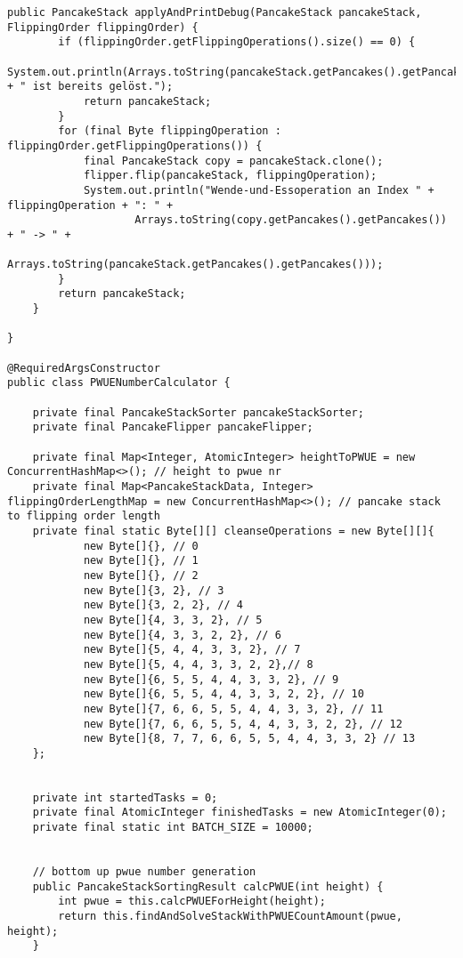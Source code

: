 \begin{lstlisting}[label={lst:source}]
    public PancakeStack applyAndPrintDebug(PancakeStack pancakeStack, FlippingOrder flippingOrder) {
        if (flippingOrder.getFlippingOperations().size() == 0) {
            System.out.println(Arrays.toString(pancakeStack.getPancakes().getPancakes()) + " ist bereits gelöst.");
            return pancakeStack;
        }
        for (final Byte flippingOperation : flippingOrder.getFlippingOperations()) {
            final PancakeStack copy = pancakeStack.clone();
            flipper.flip(pancakeStack, flippingOperation);
            System.out.println("Wende-und-Essoperation an Index " + flippingOperation + ": " +
                    Arrays.toString(copy.getPancakes().getPancakes()) + " -> " +
                    Arrays.toString(pancakeStack.getPancakes().getPancakes()));
        }
        return pancakeStack;
    }

}

@RequiredArgsConstructor
public class PWUENumberCalculator {

    private final PancakeStackSorter pancakeStackSorter;
    private final PancakeFlipper pancakeFlipper;

    private final Map<Integer, AtomicInteger> heightToPWUE = new ConcurrentHashMap<>(); // height to pwue nr
    private final Map<PancakeStackData, Integer> flippingOrderLengthMap = new ConcurrentHashMap<>(); // pancake stack to flipping order length
    private final static Byte[][] cleanseOperations = new Byte[][]{
            new Byte[]{}, // 0
            new Byte[]{}, // 1
            new Byte[]{}, // 2
            new Byte[]{3, 2}, // 3
            new Byte[]{3, 2, 2}, // 4
            new Byte[]{4, 3, 3, 2}, // 5
            new Byte[]{4, 3, 3, 2, 2}, // 6
            new Byte[]{5, 4, 4, 3, 3, 2}, // 7
            new Byte[]{5, 4, 4, 3, 3, 2, 2},// 8
            new Byte[]{6, 5, 5, 4, 4, 3, 3, 2}, // 9
            new Byte[]{6, 5, 5, 4, 4, 3, 3, 2, 2}, // 10
            new Byte[]{7, 6, 6, 5, 5, 4, 4, 3, 3, 2}, // 11
            new Byte[]{7, 6, 6, 5, 5, 4, 4, 3, 3, 2, 2}, // 12
            new Byte[]{8, 7, 7, 6, 6, 5, 5, 4, 4, 3, 3, 2} // 13
    };


    private int startedTasks = 0;
    private final AtomicInteger finishedTasks = new AtomicInteger(0);
    private final static int BATCH_SIZE = 10000;


    // bottom up pwue number generation
    public PancakeStackSortingResult calcPWUE(int height) {
        int pwue = this.calcPWUEForHeight(height);
        return this.findAndSolveStackWithPWUECountAmount(pwue, height);
    }


\end{lstlisting}

